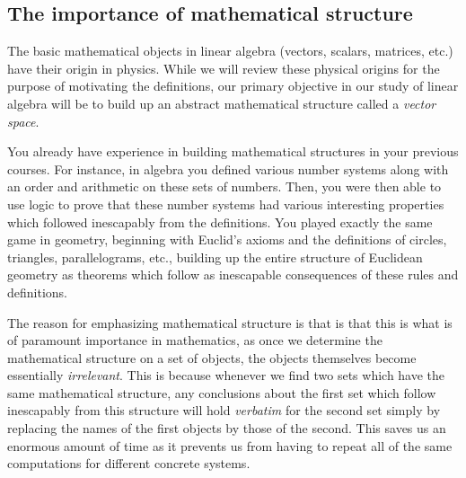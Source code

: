 \documentclass[12pt,letterpaper,reqno]{article}
\numberwithin{equation}{section}
\newcommand{\ti}[1]{\textit{#1}}
\newcommand{\fixme}[1]{{\color{orange}{[#1]}}}
\begin{document}
\subsection{The importance of mathematical structure}
The basic mathematical objects in linear algebra (vectors, scalars, matrices, etc.) have their origin in physics. While we will review these physical origins for the purpose of motivating the definitions, our primary objective in our study of linear algebra will be to build up an abstract mathematical structure called a \ti{vector space}. 

You already have experience in building mathematical structures in your previous courses. For instance, in algebra you defined various number systems along with an order and arithmetic on these sets of numbers. Then, you were then able to use logic to prove that these number systems had various interesting properties which followed inescapably from the definitions. You played exactly the same game in geometry, beginning with Euclid's axioms and the definitions of circles, triangles, parallelograms, etc., building up the entire structure of Euclidean geometry as theorems which follow as inescapable consequences of these rules and definitions.

The reason for emphasizing mathematical structure is that is that this is what is of paramount importance in mathematics, as once we determine the mathematical structure on a set of objects, the objects themselves become essentially \ti{irrelevant}. This is because whenever we find two sets which have the same mathematical structure, any conclusions about the first set which follow inescapably from this structure will hold \ti{verbatim} for the second set simply by replacing the names of the first objects by those of the second. This saves us an enormous amount of time as it prevents us from having to repeat all of the same computations for different concrete systems. \fixme{Include an illustrative example.}
\end{document}
